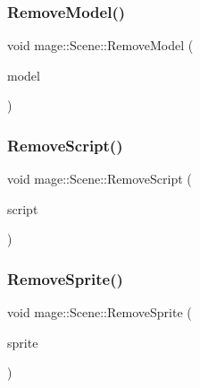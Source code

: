 \hypertarget{classmage_1_1_scene_a1b66a3d247eaa143234d15d72aa67a85}{}\label{classmage_1_1_scene_a1b66a3d247eaa143234d15d72aa67a85} 
\subsubsection{\texorpdfstring{Remove\+Model()}{RemoveModel()}}
{\footnotesize\ttfamily void mage\+::\+Scene\+::\+Remove\+Model (\begin{DoxyParamCaption}\item[{\hyperlink{namespacemage_a1e01ae66713838a7a67d30e44c67703e}{Shared\+Ptr}$<$ \hyperlink{classmage_1_1_model_node}{Model\+Node} $>$}]{model }\end{DoxyParamCaption})\hspace{0.3cm}{\ttfamily [private]}}

\hypertarget{classmage_1_1_scene_a82705ba56543dea410439760b1667bc5}{}\label{classmage_1_1_scene_a82705ba56543dea410439760b1667bc5} 
\subsubsection{\texorpdfstring{Remove\+Script()}{RemoveScript()}}
{\footnotesize\ttfamily void mage\+::\+Scene\+::\+Remove\+Script (\begin{DoxyParamCaption}\item[{\hyperlink{namespacemage_a1e01ae66713838a7a67d30e44c67703e}{Shared\+Ptr}$<$ \hyperlink{classmage_1_1_behavior_script}{Behavior\+Script} $>$}]{script }\end{DoxyParamCaption})}

\hypertarget{classmage_1_1_scene_a6d886d48157b9988ab61cc9b01ee752e}{}\label{classmage_1_1_scene_a6d886d48157b9988ab61cc9b01ee752e} 
\subsubsection{\texorpdfstring{Remove\+Sprite()}{RemoveSprite()}}
{\footnotesize\ttfamily void mage\+::\+Scene\+::\+Remove\+Sprite (\begin{DoxyParamCaption}\item[{\hyperlink{namespacemage_a1e01ae66713838a7a67d30e44c67703e}{Shared\+Ptr}$<$ \hyperlink{classmage_1_1_sprite_object}{Sprite\+Object} $>$}]{sprite }\end{DoxyParamCaption})}

